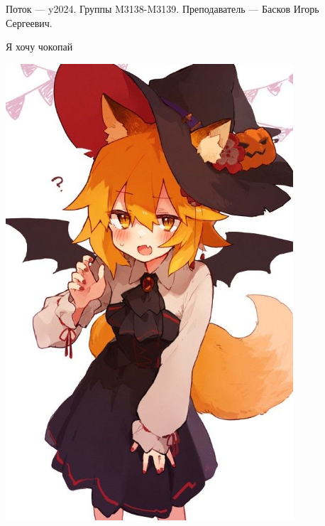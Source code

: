 Поток — y2024.\newline
Группы M3138-M3139.\newline
Преподаватель --- Басков Игорь Сергеевич.\par

Я хочу чокопай
\begin{center}
   \includegraphics[height=17cm]{assets/senko.jpg}
\end{center}